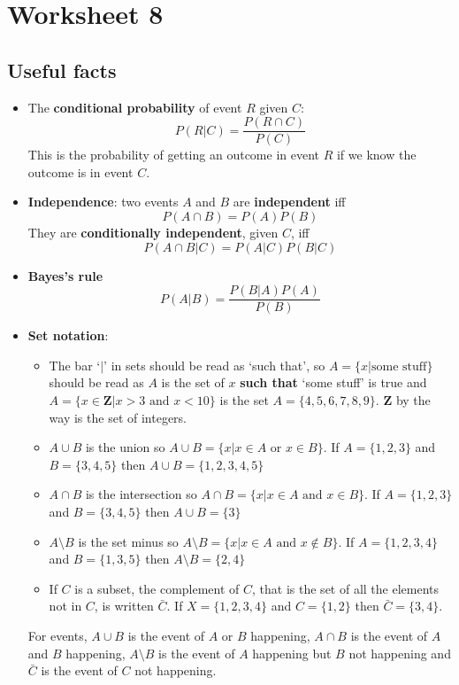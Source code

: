 \documentclass[11pt,a4paper]{scrartcl}
\begin{document}
\section*{Worksheet 8}

\subsection*{Useful facts}

\begin{itemize}

\item The \textbf{conditional probability} of event $R$ given $C$:
  \begin{equation}
P(R|C)=\frac{P(R\cap C)}{P(C)} 
  \end{equation}
  This is the probability of getting an outcome in event $R$ if we
  know the outcome is in event $C$.

\item \textbf{Independence}: two events $A$ and $B$ are \textbf{independent} iff
  \begin{equation}
    P(A\cap B)=P(A)P(B)
  \end{equation}
  They are \textbf{conditionally independent}, given $C$, iff
  \begin{equation}
    P(A\cap B|C)=P(A|C)P(B|C)
  \end{equation}

\item \textbf{Bayes's rule}
\begin{equation}
P(A|B)=\frac{P(B|A)P(A)}{P(B)}
\end{equation}

\item \textbf{Set notation}:
  \begin{itemize}
\item The bar `$|$' in sets should be read as `such that', so $A=\{x|\mbox{some stuff}\}$ should be read as $A$ is the set of $x$ \textbf{such that} `some stuff' is true and $A=\{x\in \mathbf{Z}|x>3\mbox{ and }x<10\}$ is the set $A=\{4,5,6,7,8,9\}$. $\mathbf{Z}$ by the way is the set of integers.
  \item $A\cup B$ is the union so $A\cup B=\{x|x\in A\mbox{ or }x\in B\}$. If $A=\{1,2,3\}$ and $B=\{3,4,5\}$ then $A\cup B=\{1,2,3,4,5\}$
  \item $A\cap B$ is the intersection so $A\cap B=\{x|x\in A\mbox{ and }x\in B\}$. If $A=\{1,2,3\}$ and $B=\{3,4,5\}$ then $A\cup B=\{3\}$
   \item $A\setminus B$ is the set minus so $A\setminus B=\{x|x\in A\mbox{ and }x\not\in B\}$. If $A=\{1,2,3,4\}$ and $B=\{1,3,5\}$ then $A\setminus B=\{2,4\}$
   \item If $C$ is a subset, the complement of $C$, that is the set of all the elements not in $C$, is written $\bar{C}$. If $X=\{1,2,3,4\}$ and $C=\{1,2\}$ then $\bar{C}=\{3,4\}$.
  \end{itemize}
  For events, $A\cup B$ is the event of $A$ or $B$ happening, $A\cap
  B$ is the event of $A$ and $B$ happening, $A\setminus B$ is the
  event of $A$ happening but $B$ not happening and $\bar{C}$ is the
  event of $C$ not happening.

  \end{itemize}
\end{document}
